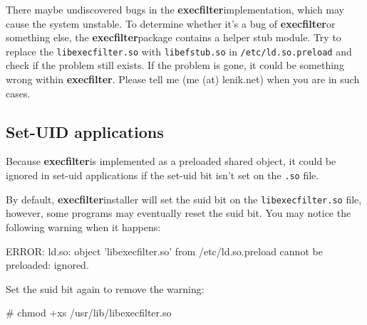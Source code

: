 \documentclass[hyperref, bookmark]{z-article}
\newcommand\code[1]{\texttt{#1}}
\newcommand\xfilt{\textbf{execfilter}}
\begin{document}
There maybe undiscovered bugs in the \xfilt implementation, which may cause the
system unstable.  To determine whether it's a bug of \xfilt or something else,
the \xfilt package contains a helper stub module.  Try to replace the
\code{libexecfilter.so} with \code{libefstub.so} in \code{/etc/ld.so.preload}
and check if the problem still exists.  If the problem is gone, it could be
something wrong within \xfilt.  Please tell me (me (at) lenik.net) when you are
in such cases.

\subsection {Set-UID applications}

Because \xfilt is implemented as a preloaded shared object, it could be ignored
in set-uid applications if the set-uid bit isn't set on the \code{.so} file.

By default, \xfilt installer will set the suid bit on the
\code{libexecfilter.so} file, however, some programs may eventually reset the
suid bit. You may notice the following warning when it happens:

\begin{console}
  ERROR: ld.so: object 'libexecfilter.so' from /etc/ld.so.preload
  cannot be preloaded: ignored.
\end{console}

Set the suid bit again to remove the warning:

\begin{console}
  # chmod +xs /usr/lib/libexecfilter.so
\end{console}

\appendix
\end{document}
